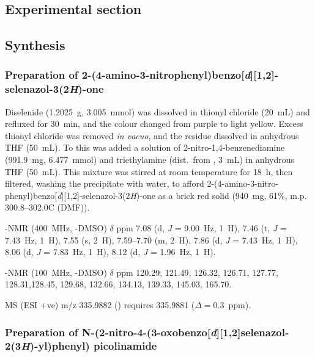 \begin{refsection}
    \section{Experimental section}
    \subsection{Synthesis}
    \subsubsection[Preparation of \refcmpd{ebs-nitroaniline}]{Preparation of 2-(4-amino-3-nitrophenyl)benzo[\emph{d}][1,2]-selenazol-3(2\emph{H})-one }
    
    Diselenide  (1.2025~g, 3.005~mmol) was dissolved in thionyl chloride (20~mL) and refluxed for 30~min, and the colour changed from purple to light yellow.
    Excess thionyl chloride was removed \emph{in vacuo}, and the residue dissolved in anhydrous THF (50~mL).
    To this was added a solution of 2-nitro-1,4-benzenediamine (991.9~mg, 6.477~mmol) and triethylamine (dist.\ from , 3~mL) in anhydrous THF (50~mL).
    This mixture was stirred at room temperature for 18~h, then filtered, washing the precipitate with water, to afford 2-(4-amino-3-nitro-phenyl)benzo[\emph{d}][1,2]-selenazol-3(2\emph{H})-one  as a brick red solid (940~mg, 61\%, m.p. 300.8--302.0\degree{}C (DMF)).

    -NMR (400~MHz, -DMSO) $\delta$ ppm
    7.08 (d, \emph{J} = 9.00~Hz, 1~H), 7.46 (t, \emph{J} = 7.43~Hz, 1~H), 7.55 (s, 2~H), 7.59--7.70 (m, 2~H), 7.86 (d, \emph{J} = 7.43~Hz, 1~H), 8.06 (d, \emph{J} = 7.83~Hz, 1~H), 8.12 (d, \emph{J} = 1.96~Hz, 1~H).
    
    -NMR (100~MHz, -DMSO) $\delta$ ppm
    120.29, 121.49, 126.32, 126.71, 127.77, 128.31,128.45, 129.68, 132.66, 134.13, 139.33, 145.03, 165.70.
    
    MS (ESI +ve) m/z 335.9882 ()  requires 335.9881 ($\Delta=0.3$~ppm).
    
    \subsubsection[Preparation of \refcmpd{ebs-nitroamide-2py}]{Preparation of N-(2-nitro-4-(3-oxobenzo[\emph{d}][1,2]selenazol-2(3\emph{H})-yl)\-phen\-yl) picolinamide }
    

\end{refsection}
